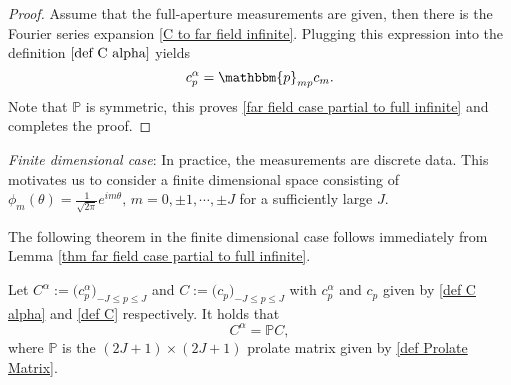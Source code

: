 \documentclass[final]{siamltex}
\newcommand{\N}{{\mathbb N}}
\newcommand{\ben}{\begin{eqnarray*}}
\newcommand{\enn}{\end{eqnarray*}}
\begin{document}
\begin{proof}
Assume that the full-aperture measurements are given, then there is the Fourier series expansion \eqref{C to far field infinite}. Plugging this expression into the definition $\eqref{def C alpha}$  yields
$$
c^\alpha_{p} = \mathbbm{p}_{mp} c_{m}.
$$
Note that $\mathbb{P}$ is symmetric, this proves \eqref{far field case partial to full infinite} and completes the proof.
\end{proof}


%
%
%
%

\vspace{1\baselineskip}

\noindent\textit{Finite dimensional case}:
In practice, the measurements are discrete data. This motivates us to consider a finite dimensional space consisting of   $\phi_m(\theta) = \frac{1}{\sqrt{2\pi}}e^{im\theta}, \, m=0, \pm1, \cdots,\pm J$ for a sufficiently large $J$.  

The following theorem in the finite dimensional case follows immediately from Lemma \ref{thm far field case partial to full infinite}.
\begin{theorem} \label{thm far field case partial to full finite}
Let $C^\alpha:=\Big(c^\alpha_{p}\Big)_{-J \le p\le J}$ and $C:=\Big(c_{p}\Big)_{-J \le p\le J}$ with $c^\alpha_{p}$ and $c_{p}$ given by \eqref{def C alpha} and \eqref{def C} respectively. It holds that
\begin{equation} \label{far field case partial to full finite}
C^{\alpha} = \mathbb{P} C,
\end{equation}
where $\mathbb{P} $ is the $(2J+1)\times (2J+1)$ prolate matrix given by \eqref{def Prolate Matrix}.
\end{theorem}
\end{document}
